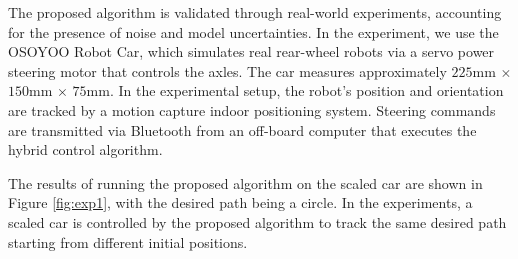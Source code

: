 {The proposed algorithm is validated through real-world experiments, accounting for the presence of noise and model uncertainties. In the experiment, we use the OSOYOO Robot Car, which simulates real rear-wheel robots via a servo power steering motor that controls the axles. 
The car measures approximately $225$mm $\times$ $150$mm $\times$ $75$mm.
In the experimental setup, the robot's position and orientation are tracked by a motion capture indoor positioning system. Steering commands are transmitted via Bluetooth from an off-board computer that executes the hybrid control algorithm. 


The results of running the proposed algorithm on the scaled car are shown in Figure \ref{fig:exp1}, with the desired path being a circle. In the experiments, a scaled car is controlled by the proposed algorithm to track the same desired path starting from different initial positions. 

}
